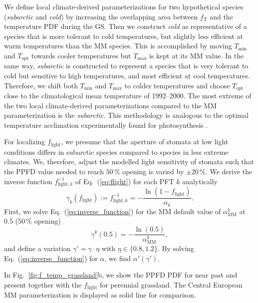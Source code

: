 \documentclass[bg, manuscript]{copernicus}
\begin{document}
We define local climate-derived parameterizations for two hypothetical species (\emph{subarctic} and \emph{cold}) by increasing the overlapping area between $f_\mathrm{T}$ and the temperature PDF during the GS. Then we construct \emph{cold} as representative of a species that is more tolerant to cold temperatures, but slightly less efficient at warm temperatures than the MM species. This is accomplished by moving $T_\mathrm{min}$ and $T_\mathrm{opt}$ towards cooler temperatures but $T_\mathrm{max}$ is kept at its MM value. In the same way, \emph{subarctic} is constructed to represent a species that is very tolerant to cold but sensitive to high temperatures, and most efficient at cool temperatures. Therefore, we shift both $T_\mathrm{min}$ and $T_\mathrm{max}$ to colder temperatures and choose $T_\mathrm{opt}$ close to the climatological mean temperature of 1992--2000. The most extreme of the two local climate-derived parameterizations compared to the MM parameterization is the \emph{subarctic}. This methodology is analogous to the optimal temperature acclimation experimentally found for photosynthesis \citep{PR:Way2013}.

For localizing $f_\mathrm{light}$, we presume that the aperture of stomata at low light conditions differs in subarctic species compared to species in less extreme climates. We, therefore, adjust the modelled light sensitivity of stomata such that the PPFD value needed to reach $50\,\unit{\%}$ opening is varied by $\pm 20\,\unit{\%}$. We derive the inverse function $f_{\mathrm{light},k}^{-1}$ of Eq.~(\ref{eq:flight}) for each PFT $k$ analytically
%
\begin{equation}
  \gamma_k(f_\mathrm{light}) := f_{\mathrm{light}, k}^{-1} = -\frac{\ln(1-f_\mathrm{light})}{\alpha_k}.
  \label{eq:inverse_function}
\end{equation}
%
First, we solve Eq.~(\ref{eq:inverse_function}) for the MM default value of $\alpha_\mathrm{MM}^k$ at $0.5$ ($50\,\%$ opening)
\begin{equation}
  \gamma^k(0.5) = -\frac{\ln(0.5)}{\alpha_\mathrm{MM}^k},
  \label{eq:inverse_function_halfway}
\end{equation}
and define a variation $\gamma' = \gamma \cdot \eta$ with $\eta \in \{0.8, 1.2\}$. By solving Eq.~(\ref{eq:inverse_function}) for $\alpha$, we find $\alpha'(\gamma')$. 

In Fig.~\ref{fig:f_temp_grassland}b, we show the PPFD PDF for near past and present together with the $f_\mathrm{light}$ for perennial grassland. The Central European MM parameterization is displayed as solid line for comparison. 
\end{document}
